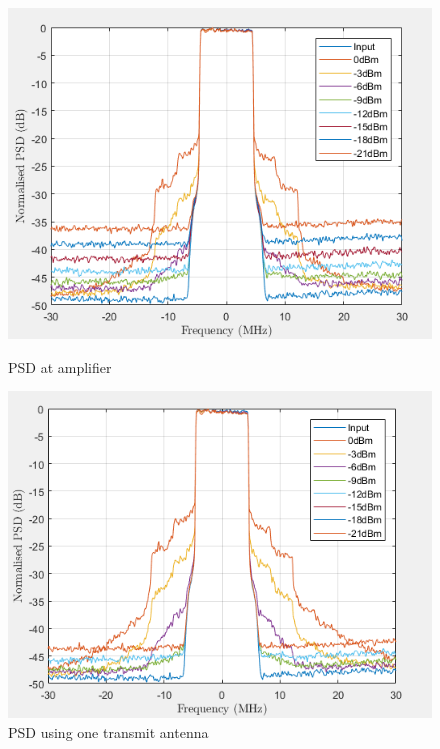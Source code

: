 \begin{figure}[H]
  \centering
  \begin{minipage}[b]{0.5\textwidth}
	\includegraphics[scale = 0.5]{figures/measurement/two_antenna/amplifier_psd.png}
	\caption{PSD at amplifier}
    \label{fig:psd_amp}
  \end{minipage}
  \hfill
  \begin{minipage}[b]{0.4\textwidth}
\includegraphics[scale = 0.5]{figures/measurement/two_antenna/one_ant_psd.png}
\caption{PSD using one transmit antenna}
    \label{fig:psd_one_ant}
  \end{minipage}
\end{figure}

